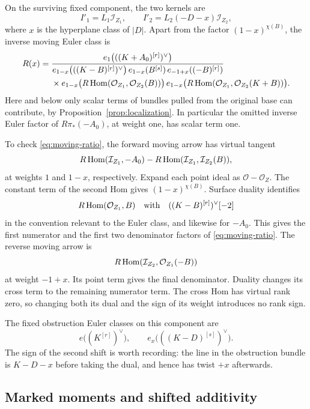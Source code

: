 On the surviving fixed component, the two kernels are
\[
 I'_1=L_1\mathcal I_{Z_1},\qquad
 I'_2=L_2(-D-x)\mathcal I_{Z_2},
\]
where \(x\) is the hyperplane class of \(|D|\).
Apart from the factor \((1-x)^{\chi(B)}\), the inverse moving Euler
class is
\begin{equation}\label{eq:moving-ratio}
 \begin{aligned}
 R(x)={}&
 \frac{e_1\bigl(((K+A_0)^{[r]})^\vee\bigr)}
 {e_{1-x}\bigl(((K-B)^{[r]})^\vee\bigr)\,
  e_{1-x}(B^{[s]})\,e_{-1+x}((-B)^{[r]})}\\
 &{}\times
 e_{1-x}\bigl(R\operatorname{Hom}(\mathcal O_{Z_1},\mathcal O_{Z_2}(B))\bigr)\,
 e_{1-x}\bigl(R\operatorname{Hom}(\mathcal O_{Z_1},\mathcal O_{Z_2}(K+B))\bigr).
 \end{aligned}
\end{equation}
Here and below only scalar terms of bundles pulled from the original
base can contribute, by Proposition~\ref{prop:localization}.
In particular the omitted inverse Euler factor of
\(R\pi_*(-A_0)\), at weight one, has scalar term one.

To check \eqref{eq:moving-ratio}, the forward moving arrow has
virtual tangent
\[
 R\operatorname{Hom}(\mathcal I_{Z_1},-A_0)
 -
 R\operatorname{Hom}(\mathcal I_{Z_1},\mathcal I_{Z_2}(B)),
\]
at weights \(1\) and \(1-x\), respectively.
Expand each point ideal as \(\mathcal O-\mathcal O_Z\).
The constant term of the second Hom gives
\((1-x)^{\chi(B)}\). Surface duality identifies
\[
 R\operatorname{Hom}(\mathcal O_{Z_1},B)
 \quad\text{with}\quad
 ((K-B)^{[r]})^\vee[-2]
\]
in the convention relevant to the Euler class, and likewise for
\(-A_0\). This gives the first numerator and the first two denominator
factors of \eqref{eq:moving-ratio}.
The reverse moving arrow is
\[
 R\operatorname{Hom}(\mathcal I_{Z_2},\mathcal O_{Z_1}(-B))
\]
at weight \(-1+x\). Its point term gives the final denominator.
Duality changes its cross term to the remaining numerator term.
The cross Hom has virtual rank zero, so changing both its dual and
the sign of its weight introduces no rank sign.

The fixed obstruction Euler classes on this component are
\[
 e\bigl((K^{[r]})^\vee\bigr),
 \qquad
 e_x\bigl(((K-D)^{[s]})^\vee\bigr).
\]
The sign of the second shift is worth recording: the line in the
obstruction bundle is \(K-D-x\) before taking the dual, and hence
has twist \(+x\) afterwards.

\subsection{Marked moments and shifted additivity}

